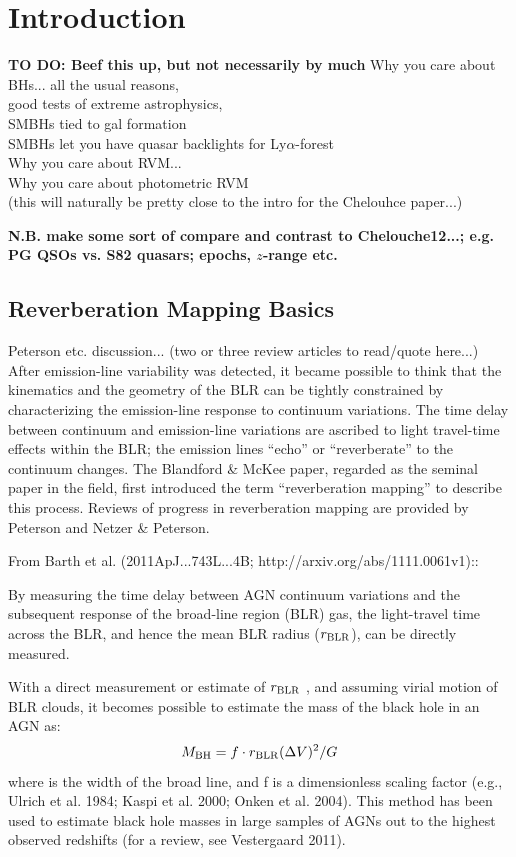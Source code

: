 \documentclass[11pt,a4paper]{article}
\begin{document}
\section{Introduction}
{\bf TO DO: Beef this up, but not necessarily by much}
Why you care about BHs... all the usual reasons, \\
good tests of extreme astrophysics,  \\
SMBHs tied to gal formation \\
SMBHs let you have quasar backlights for Ly$\alpha$-forest\\

Why you care about RVM... \\

Why you care about photometric RVM \\

(this will naturally be pretty close to the intro for the
Chelouhce paper...) 

{\bf N.B. make some sort of compare and contrast to Chelouche12...; 
e.g. PG QSOs vs. S82 quasars; epochs, $z$-range etc.}

\subsection{Reverberation Mapping Basics}
Peterson etc. discussion... (two or three review articles to read/quote here...)
After emission-line variability was detected, it became possible to
think that the kinematics and the geometry of the BLR can be tightly
constrained by characterizing the emission-line response to continuum
variations. The time delay between continuum and emission-line
variations are ascribed to light travel-time effects within the BLR;
the emission lines ``echo'' or ``reverberate'' to the continuum
changes. The Blandford \& McKee paper, regarded as the seminal paper
in the field, first introduced the term ``reverberation mapping'' to
describe this process. Reviews of progress in reverberation mapping
are provided by Peterson and Netzer \& Peterson.

\smallskip
\smallskip
\noindent
From Barth et al. (2011ApJ...743L...4B; http://arxiv.org/abs/1111.0061v1)::

\smallskip
\smallskip
\noindent
By measuring the time delay between AGN continuum variations and the
subsequent response of the broad-line region (BLR) gas, the
light-travel time across the BLR, and hence the mean BLR radius
($r_{\rm BLR}$), can be directly measured.

\smallskip
\smallskip
\noindent
With a direct measurement or estimate of $r_{\rm BLR}$ , and assuming
virial motion of BLR clouds, it becomes possible to estimate the mass
of the black hole in an AGN as:
\begin{equation}
M_{\rm BH} = f\cdot  r_{\rm BLR}(\Delta V)^{2}/G	
\end{equation}
where is the width of the broad line, and f is a dimensionless scaling
factor (e.g., Ulrich et al. 1984; Kaspi et al. 2000; Onken et
al. 2004). This method has been used to estimate black hole masses in
large samples of AGNs out to the highest observed redshifts (for a
review, see Vestergaard 2011).
\end{document}
